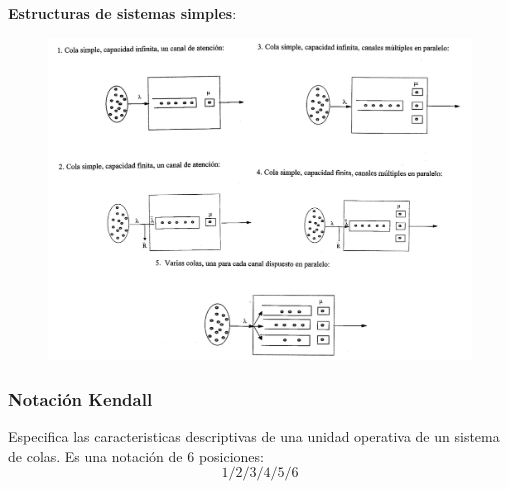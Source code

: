 \documentclass{article}
\begin{document}
\newpage
\textbf{Estructuras de sistemas simples}:
\begin{figure}[h!]
    \includegraphics[width=\linewidth]{imagenes/estructuras_simples.png}
\end{figure}

\newpage
\subsubsection{Notación Kendall}
Especifica las caracteristicas descriptivas de una unidad operativa de un sistema de colas. Es una notación de 6 posiciones:
\begin{equation}
    1 / 2 / 3 / 4 / 5 / 6    
\end{equation}
\end{document}
